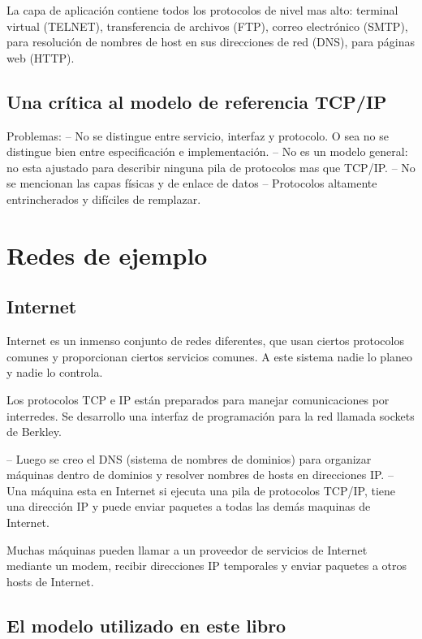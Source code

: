 \documentclass[10pt,a4paper]{report}
\begin{document}
La capa de aplicación contiene todos los protocolos de nivel mas alto: terminal virtual (TELNET), transferencia de archivos (FTP), correo electrónico (SMTP), para resolución de nombres de host en sus direcciones de red (DNS), para páginas web (HTTP).

\subsection{Una crítica al modelo de referencia TCP/IP}

Problemas:
– No se distingue entre servicio, interfaz y protocolo.
 O sea no se distingue bien entre especificación e implementación.
– No es un modelo general: no esta ajustado para describir ninguna pila de protocolos mas que TCP/IP.
– No se mencionan las capas físicas y de enlace de datos
– Protocolos altamente entrincherados y difíciles de remplazar.

\section{Redes de ejemplo}

\subsection{Internet}
\par Internet es un inmenso conjunto de redes diferentes, que usan ciertos 
protocolos comunes y proporcionan ciertos servicios comunes. A este sistema nadie 
lo planeo y nadie lo controla. 
\par Los protocolos TCP e IP están preparados para manejar comunicaciones por 
interredes. Se desarrollo una interfaz de programación para la red llamada sockets 
de Berkley.

– Luego se creo el DNS (sistema de nombres de dominios) para organizar máquinas 
dentro de dominios y resolver nombres de hosts en direcciones IP.
– Una máquina esta en Internet si ejecuta una pila de protocolos TCP/IP, tiene una 
dirección IP y puede enviar paquetes a todas las demás maquinas de Internet.

Muchas máquinas pueden llamar a un proveedor de servicios de Internet mediante 
un modem, recibir direcciones IP temporales y enviar paquetes a otros hosts de 
Internet.

\subsection{El modelo utilizado en este libro}
\end{document}
